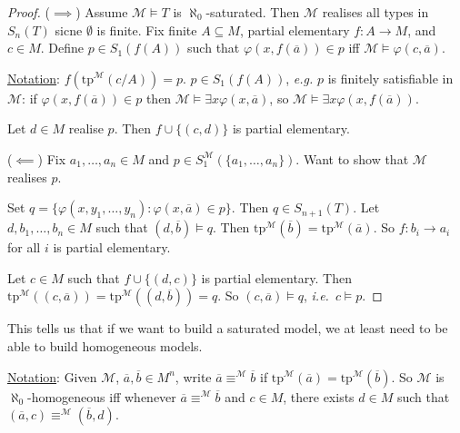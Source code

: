 \documentclass[]{article}
\theoremstyle{custhm}
\theoremstyle{cusdef}
\theoremstyle{custhm}
\theoremstyle{custhm}
\theoremstyle{custhm}
\theoremstyle{ex}
\theoremstyle{custhm}
\theoremstyle{cusdef}
\theoremstyle{remark}
\theoremstyle{remark}
\theoremstyle{numremark}
\newcommand{\ra}{\rightarrow}
\newcommand{\ie}{\textit{i.e.}}
\renewcommand{\it}[1]{\textit{#1}}
\newcommand{\M}{\mathcal{M}}
\renewcommand{\phi}{\varphi}
\renewcommand{\bar}{\overline}
\newcommand{\tp}{\textrm{tp}}
\renewcommand{\subset}{\subseteq}
\begin{document}
\begin{proof}
($\implies$) Assume $\M\models T$ is $\aleph_0$-saturated. Then $\M$ realises all types in $S_n(T)$ sicne $\emptyset$ is finite. Fix finite $A\subset M$, partial elementary $f:A\ra M$, and $c\in M$. Define $p\in S_1(f(A))$ such that $\phi(x,f(\bar{a}))\in p$ iff $\M\models \phi(c,\bar{a})$.

\underline{Notation}: $f(\tp^\M(c/A)) = p$. $p \in S_1(f(A))$, \it{e.g.} $p$ is finitely satisfiable in $\M$: if $\phi(x,f(\bar{a}))\in p$ then $\M\models \exists x \phi(x,\bar{a})$, so $\M\models \exists x \phi(x,f(\bar{a}))$.

Let $d \in M$ realise $p$. Then $f\cup\{(c,d)\}$ is partial elementary.

($\impliedby$) Fix $a_1,\dots,a_n\in M$ and $p\in S_1^\M(\{a_1,\dots,a_n\})$. Want to show that $\M$ realises $p$.

Set $q = \{\phi(x,y_1,\dots,y_n):\phi(x,\bar{a})\in p\}$. Then $q \in S_{n+1}(T)$. Let $d,b_1,\dots,b_n \in M$ such that $(d,\bar{b})\models q$. Then $\tp^\M(\bar{b}) = \tp^\M(\bar{a})$. So $f:b_i\ra a_i$ for all $i$ is partial elementary.

Let $c\in M$ such that $f\cup \{(d,c)\}$ is partial elementary. Then $\tp^\M((c,\bar{a})) = \tp^\M((d,\bar{b})) = q$. So $(c,\bar{a})\models q$, \ie\ $c\models p$.
\end{proof}

This tells us that if we want to build a saturated model, we at least need to be able to build homogeneous models.

\underline{Notation}: Given $\M$, $\bar{a},\bar{b}\in M^n$, write $\bar{a}\equiv^\M\bar{b}$ if $\tp^\M(\bar{a}) = \tp^\M(\bar{b})$. So $\M$ is $\aleph_0$-homogeneous iff whenever $\bar{a}\equiv^\M\bar{b}$ and $c\in M$, there exists $d\in M$ such that $(\bar{a},c) \equiv^\M (\bar{b},d)$.
\end{document}
